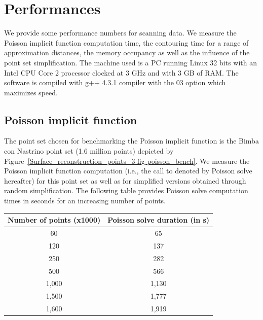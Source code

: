\section{Performances}
\label{surface_reconstruction_section_performances}

We provide some performance numbers for scanning data. We measure the Poisson implicit function computation time, the contouring time for a range of approximation distances, the memory occupancy as well as the influence of the point set simplification. The machine used is a PC running Linux 32 bits with an Intel CPU Core 2 processor clocked at 3 GHz and with 3 GB of RAM. The software is compiled with g++ 4.3.1 compiler with the 03 option which maximizes speed.

\subsection{Poisson implicit function}

The point set chosen for benchmarking the Poisson implicit function is the Bimba con Nastrino point set (1.6 million points) depicted by Figure~\ref{Surface_reconstruction_points_3-fig-poisson_bench}. We measure the Poisson implicit function computation (i.e., the call to  denoted by Poisson solve hereafter) for this point set as well as for simplified versions obtained through random simplification. The following table provides Poisson solve computation times in seconds for an increasing number of points.

\begin{tabular}{|c|c|}
  \hline
  Number of points (x1000) & Poisson solve duration (in s) \\
  \hline
  60                         & 65 \\
  120                        & 137 \\
  250                        & 282 \\
  500                        & 566 \\
  1,000                       & 1,130 \\
  1,500                       & 1,777 \\
  1,600                       & 1,919 \\
  \hline
\end{tabular}

